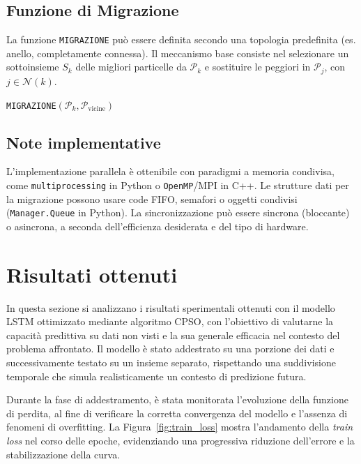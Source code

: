 \documentclass{article}
\begin{document}
\subsection{Funzione di Migrazione}

La funzione \texttt{MIGRAZIONE} può essere definita secondo una topologia predefinita (es. anello, completamente connessa). Il meccanismo base consiste nel selezionare un sottoinsieme $S_k$ delle migliori particelle da $\mathcal{P}_k$ e sostituire le peggiori in $\mathcal{P}_j$, con $j \in \mathcal{N}(k)$.

\begin{algorithm}[H]
\caption{\texttt{MIGRAZIONE}$(\mathcal{P}_k, \mathcal{P}_{\text{vicine}})$}
\end{algorithm}

\subsection{Note implementative}

L'implementazione parallela è ottenibile con paradigmi a memoria condivisa, come \texttt{multiprocessing} in Python o \texttt{OpenMP}/MPI in C++. Le strutture dati per la migrazione possono usare code FIFO, semafori o oggetti condivisi (\texttt{Manager.Queue} in Python). La sincronizzazione può essere sincrona (bloccante) o asincrona, a seconda dell’efficienza desiderata e del tipo di hardware.

\section{Risultati ottenuti}

In questa sezione si analizzano i risultati sperimentali ottenuti con il modello LSTM ottimizzato mediante algoritmo CPSO, con l’obiettivo di valutarne la capacità predittiva su dati non visti e la sua generale efficacia nel contesto del problema affrontato. Il modello è stato addestrato su una porzione dei dati e successivamente testato su un insieme separato, rispettando una suddivisione temporale che simula realisticamente un contesto di predizione futura.

Durante la fase di addestramento, è stata monitorata l’evoluzione della funzione di perdita, al fine di verificare la corretta convergenza del modello e l’assenza di fenomeni di overfitting. La Figura~\ref{fig:train_loss} mostra l’andamento della \textit{train loss} nel corso delle epoche, evidenziando una progressiva riduzione dell’errore e la stabilizzazione della curva.
\end{document}

